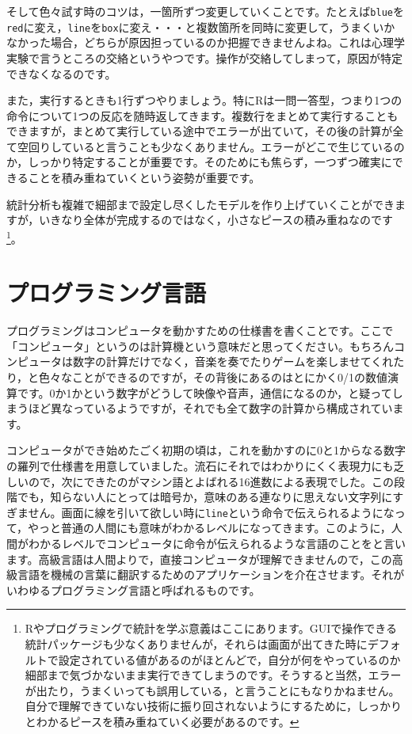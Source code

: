 \documentclass{ltjsbook}
\begin{document}
そして色々試す時のコツは，一箇所ずつ変更していくことです。たとえば\texttt{blue}を\texttt{red}に変え，\texttt{line}を\texttt{box}に変え・・・と複数箇所を同時に変更して，うまくいかなかった場合，どちらが原因担っているのか把握できませんよね。これは心理学実験で言うところの交絡というやつです。操作が交絡してしまって，原因が特定できなくなるのです。

また，実行するときも1行ずつやりましょう。特にRは一問一答型，つまり1つの命令について1つの反応を随時返してきます。複数行をまとめて実行することもできますが，まとめて実行している途中でエラーが出ていて，その後の計算が全て空回りしていると言うことも少なくありません。エラーがどこで生じているのか，しっかり特定することが重要です。そのためにも焦らず，一つずつ確実にできることを積み重ねていくという姿勢が重要です。

統計分析も複雑で細部まで設定し尽くしたモデルを作り上げていくことができますが，いきなり全体が完成するのではなく，小さなピースの積み重ねなのです\footnote{Rやプログラミングで統計を学ぶ意義はここにあります。GUIで操作できる統計パッケージも少なくありませんが，それらは画面が出てきた時にデフォルトで設定されている値があるのがほとんどで，自分が何をやっているのか細部まで気づかないまま実行できてしまうのです。そうすると当然，エラーが出たり，うまくいっても誤用している，と言うことにもなりかねません。自分で理解できていない技術に振り回されないようにするために，しっかりとわかるピースを積み重ねていく必要があるのです。}。


\section{プログラミング言語}

プログラミングはコンピュータを動かすための仕様書を書くことです。ここで「コンピュータ」というのは計算機という意味だと思ってください。もちろんコンピュータは数字の計算だけでなく，音楽を奏でたりゲームを楽しませてくれたり，と色々なことができるのですが，その背後にあるのはとにかく0/1の数値演算です。0か1かという数字がどうして映像や音声，通信になるのか，と疑ってしまうほど異なっているようですが，それでも全て数字の計算から構成されています。

コンピュータができ始めたごく初期の頃は，これを動かすのに0と1からなる数字の羅列で仕様書を用意していました。流石にそれではわかりにくく表現力にも乏しいので，次にできたのがマシン語とよばれる16進数による表現でした。この段階でも，知らない人にとっては暗号か，意味のある連なりに思えない文字列にすぎません。画面に線を引いて欲しい時に\texttt{line}という命令で伝えられるようになって，やっと普通の人間にも意味がわかるレベルになってきます。このように，人間がわかるレベルでコンピュータに命令が伝えられるような言語のことをと言います。高級言語は人間よりで，直接コンピュータが理解できませんので，この高級言語を機械の言葉に翻訳するためのアプリケーションを介在させます。それがいわゆるプログラミング言語と呼ばれるものです。
\end{document}
